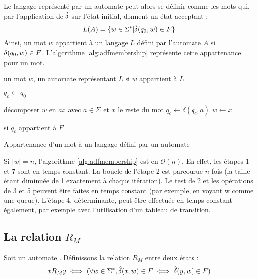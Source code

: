 	 Le langage représenté par un automate \automaton peut alors se définir comme les mots qui, par l'application de $\hat{\delta}$ sur l'état initial, donnent un état acceptant :
	 $$
	 L(A)= \{w \in \Sigma^* | \hat{\delta}(q_0,w) \in F\}
	 $$
	 Ainsi, un mot $w$ appartient à un langage $L$ défini par l'automate $A$ si $\hat{\delta}(q_0,w) \in F$. L'algorithme \ref{alg:adfmembership} représente cette appartenance pour un mot.
	 
	 
	 
	 \begin{algorithm}[H]
	 	\begin{algorithmic}[1]
	 		\REQUIRE un mot $w$, un automate \automaton représentant $L$
	 		\ENSURE si $w$ appartient à $L$
	 		
	 		\STATE $q_{c} \leftarrow q_0$ 
	 		
	 		\STATE décomposer $w$ en $ax$ avec $a\in\Sigma$ et $x$ le reste du mot
	 		\STATE $q_c \leftarrow \delta(q_c,a)$ 
	 		\STATE $w \leftarrow x$
	 		\ENDWHILE
	 		
	 		\RETURN si $q_c$ appartient à $F$
	 	\end{algorithmic}
	 	\caption{Appartenance d'un mot à un langage défini par un automate}\label{alg:adfmembership}
	 \end{algorithm}
 
 	\begin{complexity}
 		Si $|w|=n$, l'algorithme \ref{alg:adfmembership} est en $\mathcal{O}(n)$. En effet, les étapes 1 et 7 sont en temps constant. La boucle de l'étape 2 est parcourue $n$ fois (la taille étant diminuée de 1 exactement à chaque itération). Le test de 2 et les opérations de 3 et 5 peuvent être faites en temps constant (par exemple, en voyant w comme une queue). L'étape 4, déterminante, peut être effectuée en temps constant également, par exemple avec l'utilisation d'un tableau de transition.
	
	\end{complexity}
	 
	 
	 
	 
	 \subsection{La relation $R_M$}\label{ss:rm}
	 
	 Soit un automate \automaton. Définissons la relation $R_M$ entre deux états : 
	 $$xR_My \iff (\forall w \in \Sigma^*,\hat{\delta}(x,w) \in F \iff \hat{\delta}(y,w) \in F)$$
	 
